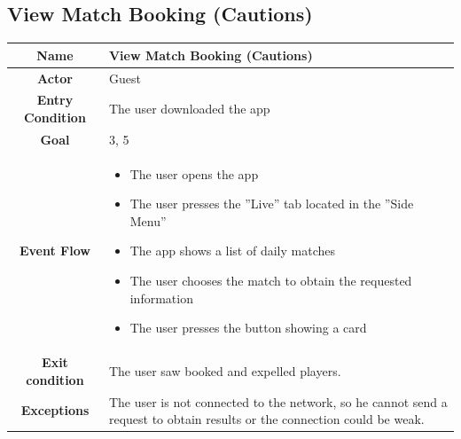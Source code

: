 \documentclass[numbers=noenddot, 12pt, a4paper, oneside]{scrbook}
\begin{document}
\subsection*{View Match Booking (Cautions)}
\begin{tabular}{|c|p{}|}
	\hline
	\parbox[c][6ex]{6ex}{\centering \textbf{Name}} & View Match Booking (Cautions)\\
	\hline
	\parbox[c][6ex]{6ex}{\centering \textbf{Actor}} & Guest \\
	\hline
	\parbox[c][10ex]{15ex}{\centering \textbf{Entry Condition}} & The user downloaded the app\\
	\hline
	\parbox[c][6ex]{15ex}{\centering \textbf{Goal}} &  3, 5\\
	\hline
	\parbox[c][10ex]{12ex}{\centering \textbf{Event Flow}} & \begin{itemize}
		\item The user opens the app
		\item The user presses the ”Live” tab located in the ”Side Menu”
		\item The app shows a list of daily matches 
		\item The user chooses the match to obtain the requested information 
		\item The user presses the button showing a card
	\end{itemize}\\
	\hline
	\parbox[c][7ex]{12ex}{\centering \textbf{Exit condition}} & The user saw booked and expelled players. \\\hline
	\parbox[c][10ex]{13ex}{\centering \textbf{Exceptions}} & The user is not connected to the network, so he cannot send a request to obtain results or the connection could be weak.  \\ \hline	
\end{tabular}
\newpage
\end{document}
